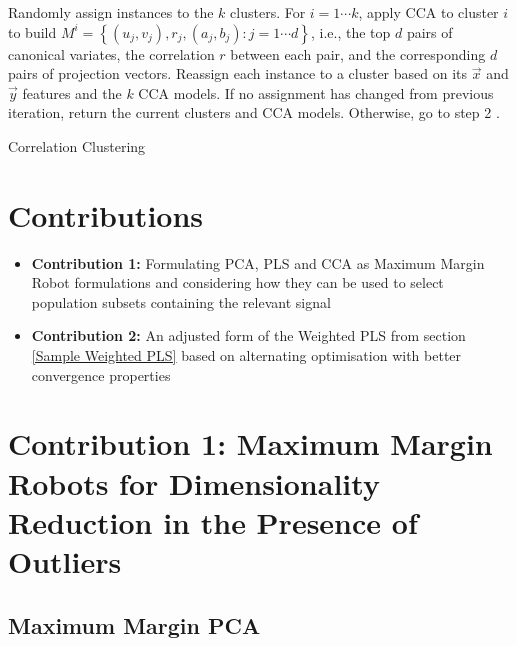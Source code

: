 \vspace{\baselineskip}
\begin{algorithm}
\begin{algorithmic}[1]
    \STATE Randomly assign instances to the $k$ clusters.
    \STATE For $i=1 \cdots k$, apply CCA to cluster $i$ to build $M^{i}=\left\{\left(u_{j}, v_{j}\right), r_{j},\left(a_{j}, b_{j}\right): j=1 \cdots d\right\}$, i.e., the top $d$ pairs of canonical variates, the correlation $r$ between each pair, and the corresponding $d$ pairs of projection vectors.
    \STATE Reassign each instance to a cluster based on its $\vec{x}$ and $\vec{y}$ features and the $k$ CCA models.
    \STATE If no assignment has changed from previous iteration, return the current clusters and CCA models. Otherwise, go to step 2 .
\ENDWHILE
\caption[Correlation Clustering]{Correlation Clustering}
\label{alg:Correlation Clustering}
\end{algorithmic}
\end{algorithm}

\section{Contributions}

\begin{itemize}
    \item \textbf{Contribution 1:} Formulating PCA, PLS and CCA as Maximum Margin Robot formulations and considering how they can be used to select population subsets containing the relevant signal
    \item \textbf{Contribution 2:} An adjusted form of the Weighted PLS from section \ref{Sample Weighted PLS} based on alternating optimisation with better convergence properties
\end{itemize}

\section{\textbf{Contribution 1:} Maximum Margin Robots for Dimensionality Reduction in the Presence of Outliers}

\subsection{Maximum Margin PCA}


